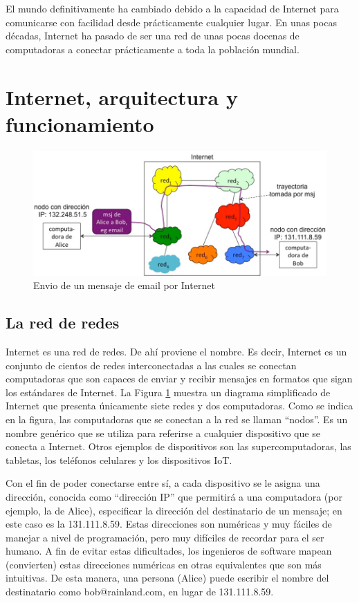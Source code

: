 \documentclass[12pt]{report} %
\begin{document}
El mundo definitivamente ha cambiado debido a la capacidad de Internet para comunicarse con facilidad desde prácticamente cualquier lugar. En unas pocas décadas, Internet ha pasado de ser una red de unas pocas docenas de computadoras a conectar prácticamente a toda la población mundial. 

\section{Internet, arquitectura y funcionamiento}


 
\begin{figure}
\centering
\includegraphics[width=0.85\columnwidth]{imagenes/enviomsjAlice2Bob.png}
\caption{Envio de un mensaje de email por Internet}
\label{fig:enviomsjAlice2Bob.png}
\end{figure} 



\subsection{La red de redes}

Internet es una red de redes. De ahí proviene el nombre. Es decir, Internet es un conjunto de cientos de redes interconectadas a las cuales se conectan computadoras que son capaces de enviar y recibir mensajes en formatos que sigan los estándares de Internet. La Figura \ref{fig:enviomsjAlice2Bob.png} muestra un diagrama simplificado de Internet que presenta únicamente siete redes y dos computadoras. Como se indica en la figura, las computadoras que se conectan a la red se  llaman “nodos”. Es un nombre genérico que se utiliza para referirse a cualquier dispositivo que se conecta a Internet. Otros ejemplos de dispositivos son las supercomputadoras, las tabletas, los teléfonos celulares y los dispositivos IoT.

Con el fin de poder conectarse entre sí, a cada dispositivo se le asigna una dirección, conocida como “dirección IP” que permitirá a una computadora (por ejemplo, la de Alice), especificar la dirección del destinatario de un mensaje; en este caso es la 131.111.8.59. Estas direcciones son numéricas y muy fáciles de manejar a nivel de programación, pero muy difíciles de recordar para el ser humano. A fin de evitar estas dificultades, los ingenieros de software mapean (convierten) estas direcciones numéricas en otras equivalentes que son más intuitivas. De esta manera, una persona (Alice) puede escribir el nombre del destinatario como bob@rainland.com,  en lugar de 131.111.8.59.
\end{document}
